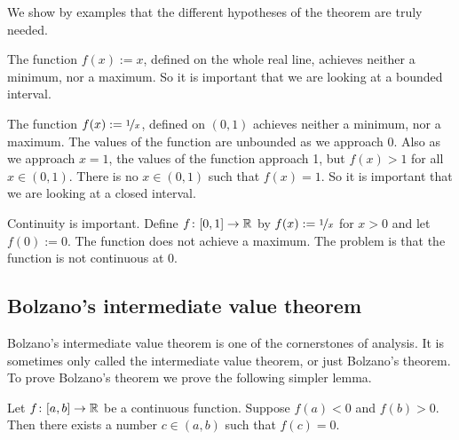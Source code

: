 We show by examples that the different hypotheses of the theorem are
truly needed.

\begin{example}
The function $f(x) := x$, defined on the whole real line,
achieves neither a minimum, nor a maximum.  So it is important that
we are looking at a bounded interval.
\end{example}

\begin{example}
The function $f(x) := \nicefrac{1}{x}$, defined on $(0,1)$ 
achieves neither a minimum, nor a maximum.  The values of the function are
unbounded as we approach 0.  Also as we approach $x=1$, the values of the
function approach 1, but $f(x) > 1$ for all $x \in (0,1)$.  There is
no $x \in (0,1)$ such that $f(x) = 1$.  So it is important that
we are looking at a closed interval.
\end{example}

\begin{example}
Continuity is important.
Define $f \colon [0,1] \to {\mathbb{R}}$ by 
$f(x) := \nicefrac{1}{x}$ for $x > 0$ and let $f(0) := 0$.
The function does not achieve a maximum.  The problem is that
the function is not continuous at 0.
\end{example}

\subsection{Bolzano's intermediate value theorem}

Bolzano's intermediate value theorem is one of the cornerstones of analysis.
It is sometimes only called the intermediate value theorem, or just
Bolzano's theorem.  To prove Bolzano's theorem we prove the
following simpler lemma.

\begin{lemma} \label{IVT:lemma}
Let $f \colon [a,b] \to {\mathbb{R}}$ be a continuous function.
Suppose $f(a) < 0$ and $f(b) > 0$. 
Then there exists a number $c \in (a,b)$
such that $f(c) = 0$.
\end{lemma}

